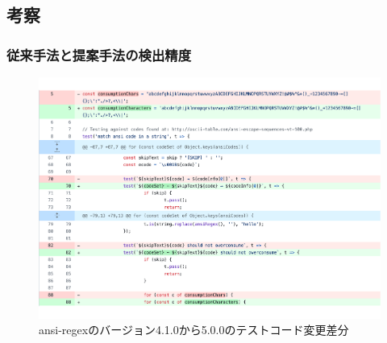 \documentclass[submit]{ipsj}
\begin{document}
\subsection{考察}\label{rq2:kousatu}


\subsubsection{従来手法と提案手法の検出精度}

\begin{figure}[t]
  \centering
  \includegraphics[width=1.0\linewidth]{IPSJjournal_maekawa_fig/rq2/ansi-regex.pdf}
  \caption{ansi-regexのバージョン4.1.0から5.0.0のテストコード変更差分}
  \label{fig:rq2.ansi-regex}


\end{figure}
\end{document}
